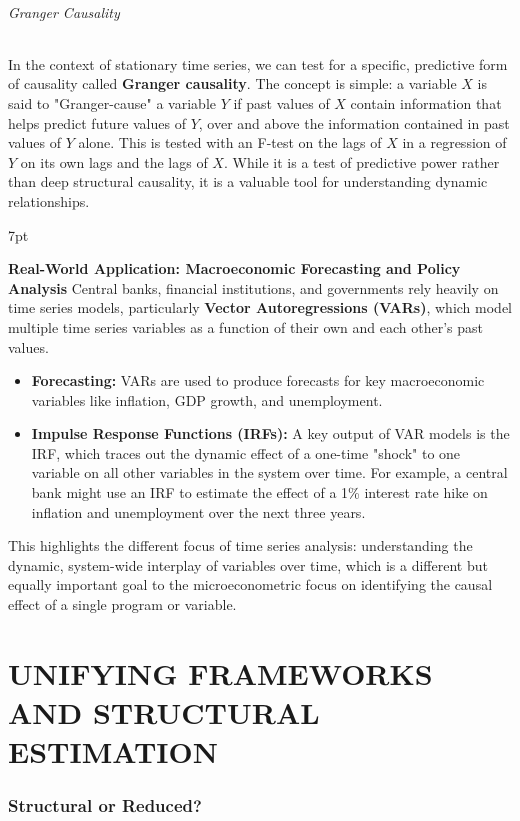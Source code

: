 \documentclass{article}
\newenvironment{redblock}{
\def\FrameCommand{
  \hspace{1pt}
    {\color{LightCoral}
    \vrule width 2pt}
    {\color{redshade}
    \vrule width 4pt}
  \colorbox{redshade}
}
\MakeFramed{
  \advance
  \hsize-
  \width
  \FrameRestore}
\noindent\hspace{-4.55pt}%
\begin{adjustwidth}{}{7pt}
\vspace{2pt}\vspace{2pt}
}
{\vspace{2pt}\end{adjustwidth}\endMakeFramed}
\begin{document}
\paragraph{Granger Causality}
In the context of stationary time series, we can test for a specific, predictive form of causality called \textbf{Granger causality}. The concept is simple: a variable $X$ is said to "Granger-cause" a variable $Y$ if past values of $X$ contain information that helps predict future values of $Y$, over and above the information contained in past values of $Y$ alone. This is tested with an F-test on the lags of $X$ in a regression of $Y$ on its own lags and the lags of $X$. While it is a test of predictive power rather than deep structural causality, it is a valuable tool for understanding dynamic relationships.

\begin{redblock}
\textbf{Real-World Application: Macroeconomic Forecasting and Policy Analysis}
Central banks, financial institutions, and governments rely heavily on time series models, particularly \textbf{Vector Autoregressions (VARs)}, which model multiple time series variables as a function of their own and each other's past values.
\begin{itemize}
    \item \textbf{Forecasting:} VARs are used to produce forecasts for key macroeconomic variables like inflation, GDP growth, and unemployment.
    \item \textbf{Impulse Response Functions (IRFs):} A key output of VAR models is the IRF, which traces out the dynamic effect of a one-time "shock" to one variable on all other variables in the system over time. For example, a central bank might use an IRF to estimate the effect of a 1\% interest rate hike on inflation and unemployment over the next three years.
\end{itemize}
This highlights the different focus of time series analysis: understanding the dynamic, system-wide interplay of variables over time, which is a different but equally important goal to the microeconometric focus on identifying the causal effect of a single program or variable.
\end{redblock}

\newpage
\part{UNIFYING FRAMEWORKS AND STRUCTURAL ESTIMATION}

\section{Structural or Reduced?}
\end{document}
